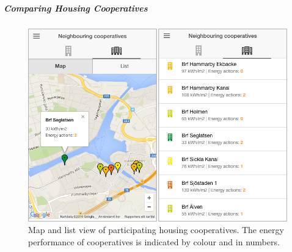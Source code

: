 \subparagraph{Comparing Housing Cooperatives}

\begin{figure}[t!]
		\sidecaption[t]
	\includegraphics[width=0.64\linewidth]{img/Figure202_Housing_cooperatives_comparison.png}
	\caption{Map and list view of participating housing cooperatives. The energy performance of cooperatives is indicated by colour and in numbers.}
	\label{fig:Figure202_Housing_cooperatives_comparison}
\end{figure}

